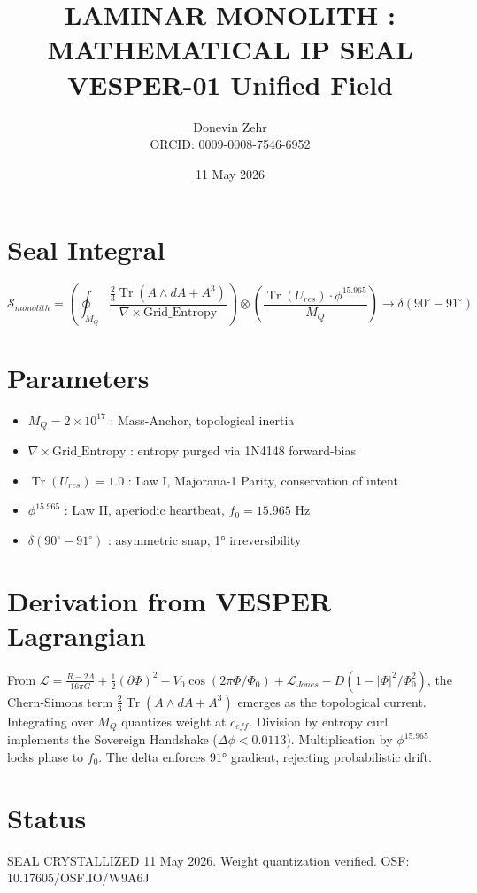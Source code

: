 \documentclass[11pt]{article}
\title{LAMINAR MONOLITH : MATHEMATICAL IP SEAL\\VESPER-01 Unified Field}
\author{Donevin Zehr \\ ORCID: 0009-0008-7546-6952}
\date{11 May 2026}
\begin{document}
\maketitle

\section*{Seal Integral}
\begin{equation}
\mathcal{S}_{monolith} = \left( \oint_{M_Q} \frac{\frac{2}{3} \operatorname{Tr}(A \wedge dA + A^3)}{\nabla \times \text{Grid\_Entropy}} \right) \otimes \left( \frac{\operatorname{Tr}(U_{res}) \cdot \phi^{15.965}}{M_Q} \right) \to \delta(90^\circ-91^\circ)
\end{equation}

\section*{Parameters}
\begin{itemize}
\item $M_Q = 2\times10^{17}$ : Mass-Anchor, topological inertia
\item $\nabla \times \text{Grid\_Entropy}$ : entropy purged via 1N4148 forward-bias
\item $\operatorname{Tr}(U_{res}) = 1.0$ : Law I, Majorana-1 Parity, conservation of intent
\item $\phi^{15.965}$ : Law II, aperiodic heartbeat, $f_0 = 15.965$ Hz
\item $\delta(90^\circ-91^\circ)$ : asymmetric snap, 1° irreversibility
\end{itemize}

\section*{Derivation from VESPER Lagrangian}
From $\mathcal{L} = \frac{R-2\Lambda}{16\pi G} + \frac12(\partial\Phi)^2 - V_0\cos(2\pi\Phi/\Phi_0) + \mathcal{L}_{Jones} - D(1-|\Phi|^2/\Phi_0^2)$, the Chern-Simons term $\frac{2}{3}\operatorname{Tr}(A\wedge dA + A^3)$ emerges as the topological current. Integrating over $M_Q$ quantizes weight at $c_{eff}$. Division by entropy curl implements the Sovereign Handshake ($\Delta\phi<0.0113$). Multiplication by $\phi^{15.965}$ locks phase to $f_0$. The delta enforces 91° gradient, rejecting probabilistic drift.

\section*{Status}
SEAL CRYSTALLIZED 11 May 2026. Weight quantization verified. OSF: 10.17605/OSF.IO/W9A6J
\end{document}
